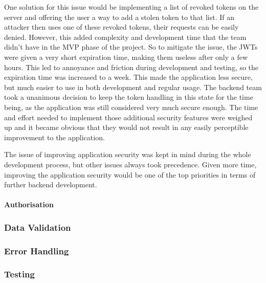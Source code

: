 One solution for this issue would be implementing a list of revoked tokens on
the server and offering the user a way to add a stolen token to that list. If an
attacker then uses one of these revoked tokens, their requests can be easily
denied. However, this added complexity and development time that the team didn't
have in the MVP phase of the project. So to mitigate the issue, the JWTs were
given a very short expiration time, making them useless after only a few hours.
This led to annoyance and friction during development and testing, so the
expiration time was increased to a week. This made the application less secure,
but much easier to use in both development and regular usage. The backend team
took a unanimous decision to keep the token handling in this state for the time
being, as the application was still considered very much secure enough. The time
and effort needed to implement those additional security features were weighed
up and it became obvious that they would not result in any easily perceptible
improvement to the application.

The issue of improving application security was kept in mind during the whole
development process, but other issues always took precedence. Given more time,
improving the application security would be one of the top priorities in terms
of further backend development.

\paragraph{Authorisation}\label{route_authorisation}


\subsubsection{Data Validation}

\subsubsection{Error Handling}

\subsubsection{Testing}
